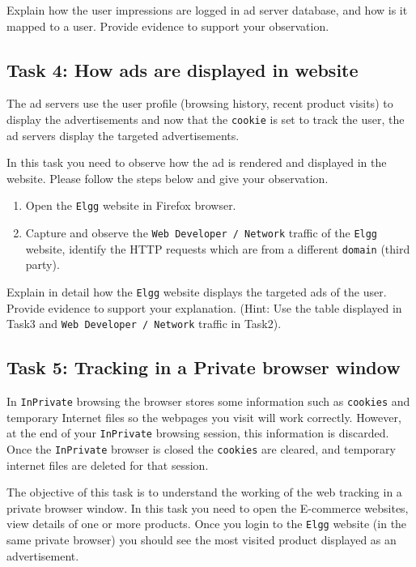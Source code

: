 Explain how the user impressions are logged in ad server database, and how is it mapped to a user. 
Provide evidence to support your observation.

\subsection{Task 4: How ads are displayed in website}

The ad servers use the user profile (browsing history, recent product visits) to display the advertisements and now that the {\tt cookie} is set to track the user, 
the ad servers display the targeted advertisements. 

In this task you need to observe how the ad is rendered and displayed in the website. 
Please follow the steps below and give your observation.
\begin{enumerate}
  \item Open the {\tt Elgg} website in Firefox browser.
  \item Capture and observe the {\tt Web Developer / Network} traffic of the {\tt Elgg} website, identify the HTTP requests which are from a different {\tt domain} (third party).
\end{enumerate}

Explain in detail how the {\tt Elgg} website displays the targeted ads of the user. 
Provide evidence to support your explanation. 
(Hint: Use the table displayed in Task3 and {\tt Web Developer / Network} traffic in Task2).

\subsection{Task 5: Tracking in a Private browser window}


In {\tt InPrivate} browsing the browser stores some information such as {\tt cookies} and temporary Internet files so the webpages you visit will work correctly. 
However, at the end of your {\tt InPrivate} browsing session, this information is discarded. 
Once the {\tt InPrivate} browser is closed the {\tt cookies} are cleared, and temporary internet files are deleted for that session.

The objective of this task is to understand the working of the web tracking in a private browser window. 
In this task you need to open the E-commerce websites, view details of one or more products. 
Once you login to the {\tt Elgg} website (in the same private browser) you should see the most visited product displayed as an advertisement.

